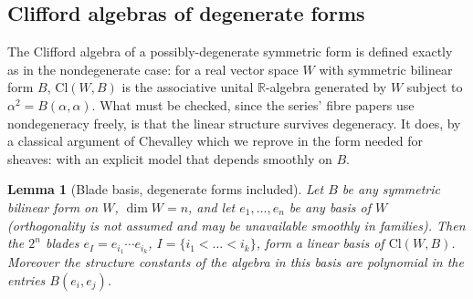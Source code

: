 \documentclass[11pt]{article}
\newtheorem{lemma}[theorem]{Lemma}
\theoremstyle{definition}
\newcommand{\Cl}{\mathrm{Cl}}
\newcommand{\R}{\mathbb{R}}
\begin{document}
\subsection{Clifford algebras of degenerate forms}\label{subsec:degclifford}

The Clifford algebra of a possibly-degenerate symmetric form is defined exactly as in the nondegenerate case: for a real vector space $W$ with symmetric bilinear form $B$, $\Cl(W, B)$ is the associative unital $\R$-algebra generated by $W$ subject to $\alpha^2 = B(\alpha, \alpha)$. What must be checked, since the series' fibre papers \cite{ButlerT1} use nondegeneracy freely, is that the linear structure survives degeneracy. It does, by a classical argument of Chevalley \cite{Chevalley1997} which we reprove in the form needed for sheaves: with an explicit model that depends smoothly on $B$.

\begin{lemma}[Blade basis, degenerate forms included]\label{lem:blades}
Let $B$ be any symmetric bilinear form on $W$, $\dim W = n$, and let $e_1, \dots, e_n$ be \emph{any} basis of $W$ (orthogonality is not assumed and may be unavailable smoothly in families). Then the $2^n$ blades $e_I = e_{i_1} \cdots e_{i_k}$, $I = \{i_1 < \dots < i_k\}$, form a linear basis of $\Cl(W, B)$. Moreover the structure constants of the algebra in this basis are polynomial in the entries $B(e_i, e_j)$.
\end{lemma}
\end{document}
